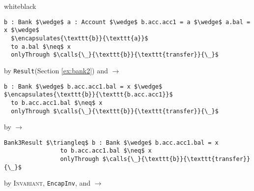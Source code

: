 \documentclass[acmsmall,review,anonymous]{acmart}\settopmatter{printfolios=true,printccs=false,printacmref=false}
\begin{document}
\begin{proofBox}{white}{black}
\footnotesize
\begin{minipage}{0.75\textwidth}
\begin{lstlisting}[language = Chainmail, mathescape=true, frame=single]
b : Bank $\wedge$ a : Account $\wedge$ b.acc.acc1 = a $\wedge$ a.bal = x $\wedge$ 
  $\encapsulates{\texttt{b}}{\texttt{a}}$
  to a.bal $\neq$ x
  onlyThrough $\calls{\_}{\texttt{b}}{\texttt{transfer}}{\_}$
\end{lstlisting}
\end{minipage}
\begin{minipage}{0.24\textwidth}
\scriptsize
\hfill by \texttt{Result}(Section \ref{ex:bank2}) and $\longrightarrow$
\end{minipage}
\begin{minipage}{0.75\textwidth}
\begin{lstlisting}[language = Chainmail, mathescape=true]
b : Bank $\wedge$ b.acc.acc1.bal = x $\wedge$ $\encapsulates{\texttt{b}}{\texttt{b.acc.acc1}}$
  to b.acc.acc1.bal $\neq$ x
  onlyThrough $\calls{\_}{\texttt{b}}{\texttt{transfer}}{\_}$
\end{lstlisting}
\end{minipage}
\begin{minipage}{0.24\textwidth}
\scriptsize
\hfill by $\longrightarrow$
\end{minipage}
\begin{minipage}{0.75\textwidth}
\begin{lstlisting}[language = Chainmail, mathescape=true]
Bank3Result $\triangleq$ b : Bank $\wedge$ b.acc.acc1.bal = x
                to b.acc.acc1.bal $\neq$ x
                onlyThrough $\calls{\_}{\texttt{b}}{\texttt{transfer}}{\_}$
\end{lstlisting}
\end{minipage}
\begin{minipage}{0.24\textwidth}
\scriptsize
\hfill by \textsc{Invariant}, \texttt{EncapInv}, and $\longrightarrow$
\end{minipage}
\end{proofBox}

\newpage
\end{document}
